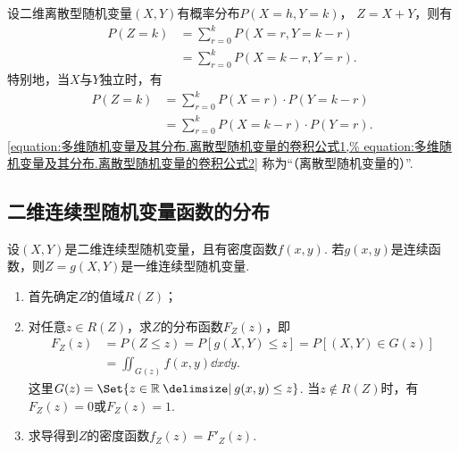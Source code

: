 \begin{theorem}\label{theorem:多维随机变量及其分布.离散型随机变量的卷积公式}
设二维离散型随机变量\((X,Y)\)有概率分布\(P(X=h,Y=k)\)，
\(Z=X+Y\)，则有\begin{align}
	P(Z=k)
	&= \sum\limits_{r=0}^k P(X=r,Y=k-r) \\
	&= \sum\limits_{r=0}^k P(X=k-r,Y=r).
\end{align}
特别地，当\(X\)与\(Y\)独立时，有\begin{align}
	P(Z=k)
	&= \sum\limits_{r=0}^k P(X=r) \cdot P(Y=k-r) \label{equation:多维随机变量及其分布.离散型随机变量的卷积公式1} \\
	&= \sum\limits_{r=0}^k P(X=k-r) \cdot P(Y=r). \label{equation:多维随机变量及其分布.离散型随机变量的卷积公式2}
\end{align}
\rm\cref{equation:多维随机变量及其分布.离散型随机变量的卷积公式1,%
equation:多维随机变量及其分布.离散型随机变量的卷积公式2}
称为“（离散型随机变量的）”.
\end{theorem}

\subsection{二维连续型随机变量函数的分布}
设\((X,Y)\)是二维连续型随机变量，且有密度函数\(f(x,y)\).
若\(g(x,y)\)是连续函数，则\(Z = g(X,Y)\)是一维连续型随机变量.
\begin{enumerate}
\item 首先确定\(Z\)的值域\(R(Z)\)；
\item 对任意\(z \in R(Z)\)，求\(Z\)的分布函数\(F_Z(z)\)，即\begin{align*}
F_Z(z) &= P(Z \leq z)
= P[g(X,Y) \leq z]
= P[(X,Y) \in G(z)] \\
&= \iint_{G(z)} f(x,y) \dd{x}\dd{y}.
\end{align*}
这里\(G(z) = \Set{ z\in\mathbb{R} \given g(x,y) \leq z }\).
当\(z \notin R(Z)\)时，有\(F_Z(z)=0\)或\(F_Z(z)=1\).
\item 求导得到\(Z\)的密度函数\(f_Z(z) = F'_Z(z)\).
\end{enumerate}

